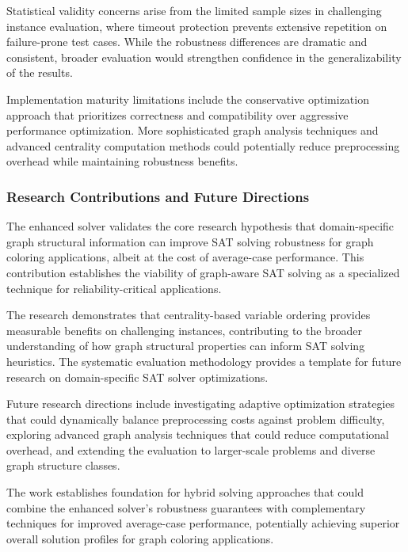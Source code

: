 Statistical validity concerns arise from the limited sample sizes in challenging instance evaluation, where timeout protection prevents extensive repetition on failure-prone test cases. While the robustness differences are dramatic and consistent, broader evaluation would strengthen confidence in the generalizability of the results.

Implementation maturity limitations include the conservative optimization approach that prioritizes correctness and compatibility over aggressive performance optimization. More sophisticated graph analysis techniques and advanced centrality computation methods could potentially reduce preprocessing overhead while maintaining robustness benefits.

\subsubsection{Research Contributions and Future Directions}

The enhanced solver validates the core research hypothesis that domain-specific graph structural information can improve SAT solving robustness for graph coloring applications, albeit at the cost of average-case performance. This contribution establishes the viability of graph-aware SAT solving as a specialized technique for reliability-critical applications.

The research demonstrates that centrality-based variable ordering provides measurable benefits on challenging instances, contributing to the broader understanding of how graph structural properties can inform SAT solving heuristics. The systematic evaluation methodology provides a template for future research on domain-specific SAT solver optimizations.

Future research directions include investigating adaptive optimization strategies that could dynamically balance preprocessing costs against problem difficulty, exploring advanced graph analysis techniques that could reduce computational overhead, and extending the evaluation to larger-scale problems and diverse graph structure classes.

The work establishes foundation for hybrid solving approaches that could combine the enhanced solver's robustness guarantees with complementary techniques for improved average-case performance, potentially achieving superior overall solution profiles for graph coloring applications.